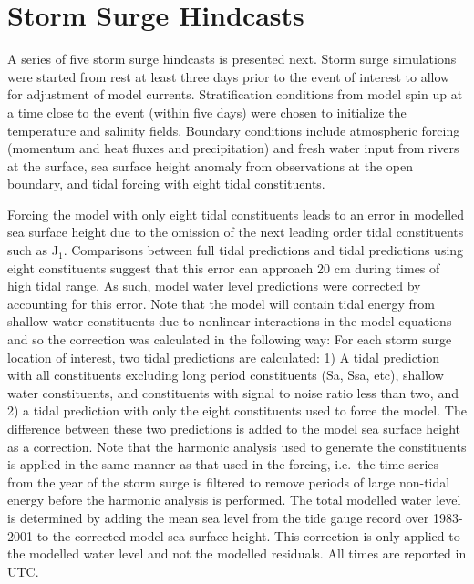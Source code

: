 \documentclass[letterpaper]{tATO2e}
\begin{document}
\section{Storm Surge Hindcasts}\label{sec:storm}
A series of five storm surge hindcasts is presented next. Storm surge simulations were started from rest at least three days prior to the event of interest to allow for adjustment of model currents. Stratification conditions from model spin up at a time close to the event (within five days) were chosen to initialize the temperature and salinity fields. {\color{red} Boundary conditions include atmospheric forcing (momentum and heat fluxes and precipitation) and fresh water input from rivers at the surface, sea surface height anomaly from observations at the open boundary, and tidal forcing with eight tidal constituents.} 


Forcing the model with only eight tidal constituents leads to an error in modelled sea surface height due to the omission of the next leading order tidal constituents such as J$_1$. Comparisons between full tidal predictions and tidal predictions using eight constituents suggest that this error can approach {\color{red} 20} cm during times of high tidal range. {\color{red} As such, model water level predictions were corrected by accounting for this error. Note that the model will contain tidal energy from shallow water constituents due to nonlinear interactions in the model equations and so the correction was calculated in the following way:  For each storm surge location of interest, two tidal predictions are calculated: 1) A tidal prediction with all constituents excluding long period constituents (Sa, Ssa, etc), shallow water constituents, and constituents with signal to noise ratio less than two, and 2) a tidal prediction with only the eight constituents used to force the model.  The difference between these two predictions is added to the model sea surface height as a correction. Note that the harmonic analysis used to generate the constituents is applied in the same manner as that used in the forcing, i.e.\, the time series from the year of the storm surge is filtered to remove periods of large non-tidal energy before the harmonic analysis is performed. The total modelled water level is determined by adding the mean sea level from the tide gauge record over 1983-2001 to the corrected model sea surface height.} This correction is only applied to the modelled water level and not the modelled residuals. All times are reported in UTC.
\end{document}
